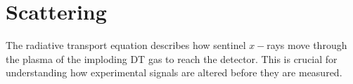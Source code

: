 \section{\label{sec:scattering}Scattering}

The radiative transport equation describes how sentinel $x-$rays move through the plasma of the imploding DT gas to reach the detector. This is crucial for understanding how experimental signals are altered before they are measured.




\endinput %